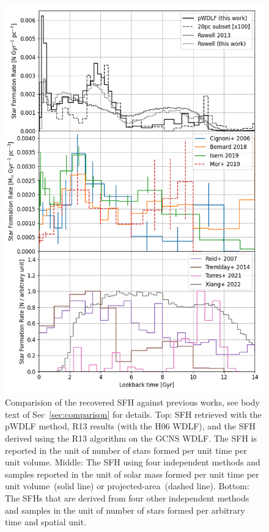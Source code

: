 \documentclass[fleqn,usenatbib]{mnras}
\begin{document}
\begin{figure}
  \includegraphics[width=\columnwidth]{figures/fig_10_compare_sfh.png}
  \caption{Comparision of the recovered SFH against previous works, see body
  text of Sec~\ref{sec:comparison} for details. Top: SFH retrieved with the
  pWDLF method, R13 results (with the H06 WDLF), and the SFH derived using the
  R13 algorithm on the GCNS WDLF. The SFH is reported
  in the unit of number of stars formed per unit time per unit volume.
  Middle: The SFH using four independent methods and samples reported in the
  unit of solar mass formed per unit time per unit volume~(solid line) or
  projected-area~(dashed line). Bottom: The SFHs that are derived from four
  other independent methods and samples in the unit of number of stars formed
  per arbitrary time and spatial unit.}
  \label{fig:comparison}
\end{figure}
\end{document}
